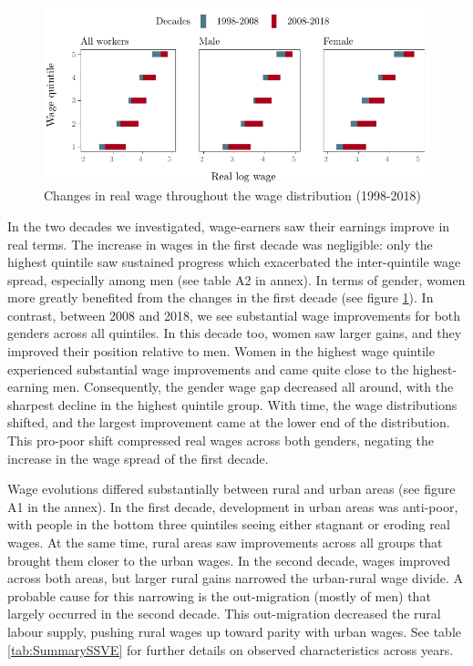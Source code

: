 \begin{figure}[htb] 
	\centering
	\includegraphics{./figure/log_real_wage_change_NLFS_all}
	\caption{Changes in real wage throughout the wage distribution (1998-2018)}
	\label{fig:wagechangeAll}
\end{figure} 

In the two decades we investigated, wage-earners saw their earnings improve in real terms. The increase in wages in the first decade was negligible: only the highest quintile saw sustained progress which exacerbated the inter-quintile wage spread, especially among men (see table A2 in annex). In terms of gender, women more greatly benefited from the changes in the first decade (see figure \ref{fig:wagechangeAll}). In contrast, between 2008 and 2018, we see substantial wage improvements for both genders across all quintiles. In this decade too, women saw larger gains, and they improved their position relative to men. Women in the highest wage quintile experienced substantial wage improvements and came quite close to the highest-earning men. Consequently, the gender wage gap decreased all around, with the sharpest decline in the highest quintile group. With time, the wage distributions shifted, and the largest improvement came at the lower end of the distribution. This pro-poor shift compressed real wages across both genders, negating the increase in the wage spread of the first decade.\par

Wage evolutions differed substantially between rural and urban areas (see figure A1 in the annex). In the first decade, development in urban areas was anti-poor, with people in the bottom three quintiles seeing either stagnant or eroding real wages. At the same time, rural areas saw improvements across all groups that brought them closer to the urban wages. In the second decade, wages improved across both areas, but larger rural gains narrowed the urban-rural wage divide. A probable cause for this narrowing is the out-migration (mostly of men) that largely occurred in the second decade. This out-migration decreased the rural labour supply, pushing rural wages up toward parity with urban wages. See table \ref{tab:SummarySSVE} for further details on observed characteristics across years.\par 

